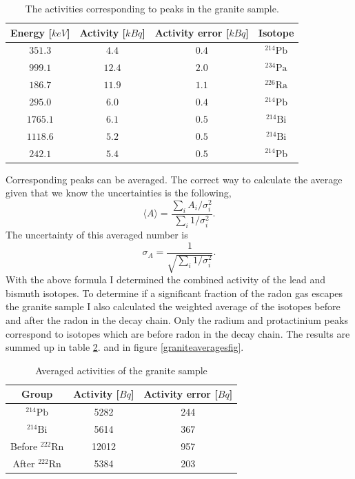 \documentclass[pdftex,12pt,a4paper]{article}
\begin{document}
		\begin{table}[H]
		\centering
		\begin{tabular}{|c|c|c|c|}
			\hline
			Energy [$keV$] & Activity [$kBq$]& Activity error [$kBq$]& Isotope \\
			\hline
                        $351.3$ & $4.4$ & $0.4$ & $^{214}\text{Pb}$ \\
            $999.1$ & $12.4$ & $2.0$ & $^{234}\text{Pa}$ \\
            $186.7$ & $11.9$ & $1.1$ & $^{226}\text{Ra}$ \\
            $295.0$ & $6.0$ & $0.4$ & $^{214}\text{Pb}$ \\
            $1765.1$ & $6.1$ & $0.5$ & $^{214}\text{Bi}$ \\
            $1118.6$ & $5.2$ & $0.5$ & $^{214}\text{Bi}$ \\
            $242.1$ & $5.4$ & $0.5$ & $^{214}\text{Pb}$ \\
			\hline
		\end{tabular}
		\caption{The activities corresponding to peaks in the granite sample.}
		 \label{granitepeaks}
		\end{table}
		Corresponding peaks can be averaged. The correct way to calculate the average given that we know the uncertainties is the following,
		\begin{equation}
			\langle A\rangle = \frac{\sum_i A_i / \sigma_i^2}{\sum_i 1 / \sigma_i^2}.
		\end{equation}
		The uncertainty of this averaged number is
		\begin{equation}
			\sigma_A = \frac{1}{\sqrt{\sum_i 1 / \sigma_i^2}}.
		\end{equation}
		With the above formula I determined the combined activity of the lead and bismuth isotopes. To determine if a significant fraction of the radon gas escapes the granite sample I also calculated the weighted average of the isotopes before and after the radon in the decay chain. Only the radium and protactinium peaks correspond to isotopes which are before radon in the decay chain. The results are summed up in table \ref{graniteaverages}. and in figure \ref{graniteaveragesfig}.
		\begin{table}[H]
		\centering
		\begin{tabular}{|c|c|c|}
			\hline
			Group & Activity [$Bq$] & Activity error [$Bq$] \\
			\hline
            $^{214}\text{Pb}$ & 5282 & 244 \\
            $^{214}\text{Bi}$ & 5614 & 367 \\
            Before $^{222}\text{Rn}$ & 12012 & 957 \\
            After $^{222}\text{Rn}$ & 5384 & 203 \\
            \hline
		\end{tabular}
		\caption{Averaged activities of the granite sample}
		\label{graniteaverages}
		\end{table}
\end{document}
